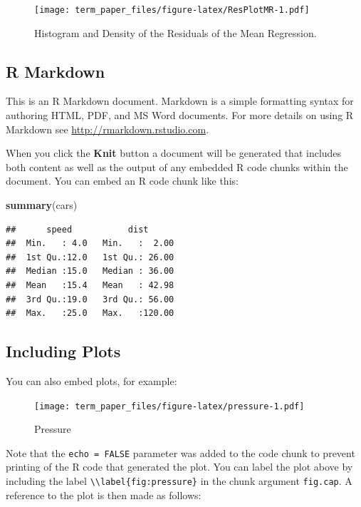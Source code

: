 \documentclass[11pt,]{article}
\newenvironment{Shaded}{\begin{snugshade}}{\end{snugshade}}
\newcommand{\KeywordTok}[1]{\textcolor[rgb]{0.13,0.29,0.53}{\textbf{#1}}}
\newcommand{\NormalTok}[1]{#1}
\begin{document}
\begin{figure}
\centering
\texttt{[image: term\_paper\_files/figure-latex/ResPlotMR-1.pdf]}
\caption{Histogram and Density of the Residuals of the Mean Regression.}
\end{figure}

\subsection{R Markdown}\label{r-markdown}

This is an R Markdown document. Markdown is a simple formatting syntax
for authoring HTML, PDF, and MS Word documents. For more details on
using R Markdown see \url{http://rmarkdown.rstudio.com}.

When you click the \textbf{Knit} button a document will be generated
that includes both content as well as the output of any embedded R code
chunks within the document. You can embed an R code chunk like this:

\begin{Shaded}
\begin{Highlighting}[]
\KeywordTok{summary}\NormalTok{(cars)}
\end{Highlighting}
\end{Shaded}

\begin{verbatim}
##      speed           dist       
##  Min.   : 4.0   Min.   :  2.00  
##  1st Qu.:12.0   1st Qu.: 26.00  
##  Median :15.0   Median : 36.00  
##  Mean   :15.4   Mean   : 42.98  
##  3rd Qu.:19.0   3rd Qu.: 56.00  
##  Max.   :25.0   Max.   :120.00
\end{verbatim}

\subsection{Including Plots}\label{including-plots}

You can also embed plots, for example:

\begin{figure}
\centering
\texttt{[image: term\_paper\_files/figure-latex/pressure-1.pdf]}
\caption{\label{fig:pressure} Pressure}
\end{figure}

Note that the \texttt{echo\ =\ FALSE} parameter was added to the code
chunk to prevent printing of the R code that generated the plot. You can
label the plot above by including the label
\texttt{\textbackslash{}\textbackslash{}label\{fig:pressure\}} in the
chunk argument \texttt{fig.cap}. A reference to the plot is then made as
follows:
\end{document}
